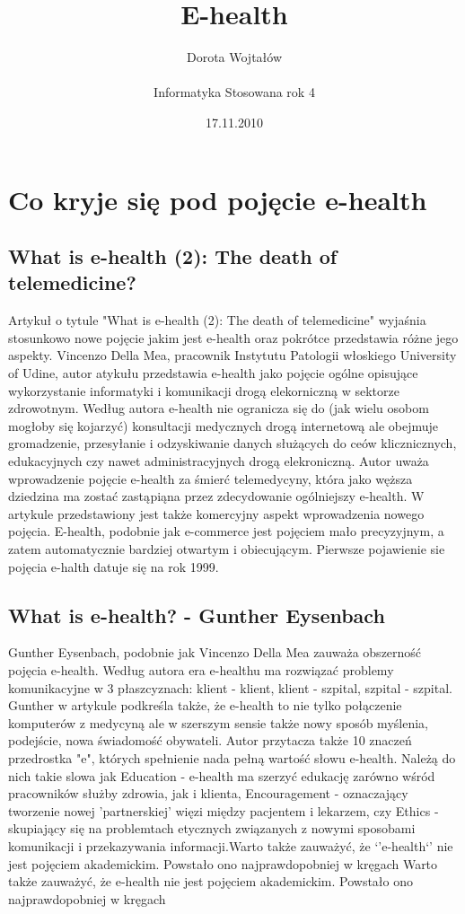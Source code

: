 \documentclass[a4paper,10pt]{article}
\begin{document}
\title{E-health}
 \author{ \LARGE Dorota Wojtałów \\ \\ \Large Informatyka Stosowana rok 4}
\date{17.11.2010}
\maketitle
\section{ Co kryje się pod pojęcie e-health}
\subsection {What is e-health (2): The death of telemedicine?}
Artykuł o tytule "What is e-health (2): The death of telemedicine" wyjaśnia stosunkowo nowe pojęcie jakim jest e-health oraz pokrótce przedstawia
różne jego aspekty. Vincenzo Della Mea, pracownik Instytutu Patologii włoskiego University of Udine, autor atykułu przedstawia e-health jako pojęcie 
ogólne opisujące wykorzystanie informatyki i komunikacji drogą elekorniczną w sektorze zdrowotnym. Według autora e-health nie ogranicza się do (jak wielu osobom
mogłoby się kojarzyć)
konsultacji medycznych drogą internetową  ale obejmuje gromadzenie, przesyłanie i odzyskiwanie danych służących do ceów klicznicznych, edukacyjnych czy nawet administracyjnych drogą elekroniczną.
Autor uważa wprowadzenie pojęcie e-health  za śmierć telemedycyny, która jako węższa dziedzina ma zostać zastąpiąna przez zdecydowanie ogólniejszy e-health.
W artykule przedstawiony jest także komercyjny aspekt wprowadzenia nowego pojęcia. E-health, podobnie jak e-commerce jest pojęciem mało precyzyjnym, a zatem
automatycznie bardziej otwartym i obiecującym.
Pierwsze pojawienie sie pojęcia e-halth datuje się na rok 1999.

\subsection{What is e-health? - Gunther Eysenbach}
Gunther Eysenbach, podobnie jak Vincenzo Della Mea zauważa obszerność pojęcia e-health. Według autora era e-healthu ma rozwiązać problemy komunikacyjne 
w 3 płaszcyznach: klient - klient, klient - szpital, szpital - szpital. Gunther w artykule podkreśla także, że e-health to nie tylko połączenie 
komputerów z medycyną ale w szerszym sensie także nowy sposób myślenia, podejście, nowa świadomość obywateli. Autor przytacza także 10 znaczeń przedrostka
"e", których spełnienie nada pełną wartość słowu e-health. Należą do nich 
takie slowa jak Education - e-health ma szerzyć edukację zarówno wśród pracowników służby zdrowia, jak i klienta,
Encouragement - oznaczający tworzenie nowej 'partnerskiej' więzi między pacjentem i lekarzem,
czy Ethics - skupiający się na problemtach etycznych związanych z nowymi sposobami komunikacji i przekazywania informacji.Warto także zauważyć, że `'e-health`' nie jest pojęciem akademickim. Powstało ono najprawdopobniej w kręgach
Warto także zauważyć, że e-health nie jest pojęciem akademickim. Powstało ono najprawdopobniej w kręgach
\end{document}
